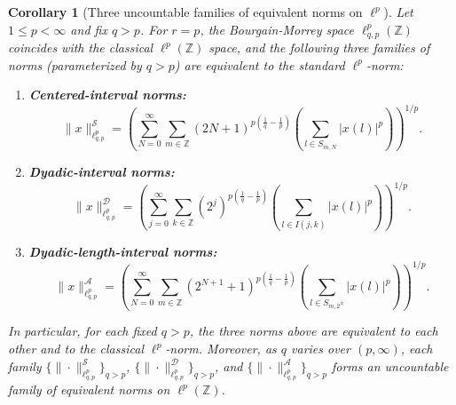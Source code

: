 \documentclass[preprint,12pt]{elsarticle}
\newtheorem{corollary}{Corollary}[theorem]
\begin{document}
\begin{corollary}[Three uncountable families of equivalent norms on $\ell^p$]
\label{cor:three-families-lp}
Let $1 \leq p < \infty$ and fix $q > p$. For $r = p$, the Bourgain-Morrey space $\ell^p_{q,p}(\mathbb{Z})$ coincides with the classical $\ell^p(\mathbb{Z})$ space, and the following three families of norms (parameterized by $q > p$) are equivalent to the standard $\ell^p$-norm:

\begin{enumerate}
    \item[(a)] \textbf{Centered-interval norms:}
    \[
    \|x\|^{\mathcal{S}}_{\ell_{q,p}^{p}} = \left( \sum_{N = 0}^{\infty} \sum_{m \in \mathbb{Z}} (2N+1)^{p\left(\frac{1}{q} - \frac{1}{p}\right)} \left( \sum_{l \in S_{m,N}} |x(l)|^{p} \right) \right)^{1/p}.
    \]

    \item[(b)] \textbf{Dyadic-interval norms:}
    \[
    \|x\|^{\mathcal{D}}_{\ell_{q,p}^{p}} = \left( \sum_{j = 0}^{\infty} \sum_{k \in \mathbb{Z}} (2^{j})^{p\left(\frac{1}{q} - \frac{1}{p}\right)} \left( \sum_{l \in I(j,k)} |x(l)|^{p} \right) \right)^{1/p}.
    \]

    \item[(c)] \textbf{Dyadic-length-interval norms:}
    \[
    \|x\|^{\mathcal{A}}_{\ell_{q,p}^{p}} = \left( \sum_{N = 0}^{\infty} \sum_{m \in \mathbb{Z}} (2^{N+1}+1)^{p\left(\frac{1}{q} - \frac{1}{p}\right)} \left( \sum_{l \in S_{m,2^{N}}} |x(l)|^{p} \right) \right)^{1/p}.
    \]
\end{enumerate}

In particular, for each fixed $q > p$, the three norms above are equivalent to each other and to the classical $\ell^p$-norm. Moreover, as $q$ varies over $(p, \infty)$, each family $\{\|\cdot\|^{\mathcal{S}}_{\ell_{q,p}^{p}}\}_{q>p}$, $\{\|\cdot\|^{\mathcal{D}}_{\ell_{q,p}^{p}}\}_{q>p}$, and $\{\|\cdot\|^{\mathcal{A}}_{\ell_{q,p}^{p}}\}_{q>p}$ forms an uncountable family of equivalent norms on $\ell^p(\mathbb{Z})$.
\end{corollary}
\end{document}
